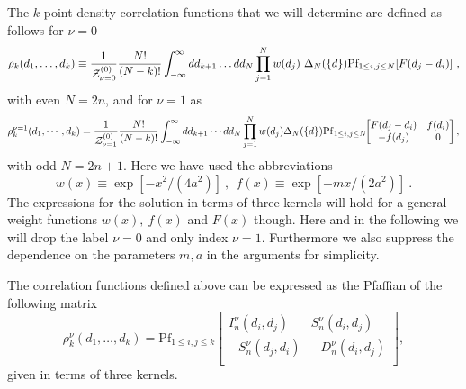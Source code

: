 \documentclass[11pt]{article}
\newcommand{\be}{\begin{equation}}
\newcommand{\ee}{\end{equation}}
\def\Pf{\mbox{Pf}}
\begin{document}
The $k$-point density correlation functions that we will determine are
defined as follows for $\nu=0$
\be
\rho_k(d_1,\ldots,d_k)\equiv\frac{1}{{\cal Z}_{\nu=0}^{(0)}}\frac{N!}{(N-k)!}
\int_{-\infty}^\infty dd_{k+1}\ldots dd_N
\prod_{j=1}^{N} w(d_j)
\ \Delta_{N}(\{d\})\Pf_{1\leq i,j\leq N}[F(d_j-d_i)]\ ,
\label{rhokdef}
\ee
with even $N=2n$, and for $\nu=1$ as 
\be
\rho_k^{\nu=1}(d_1,\cdots,d_k) = \frac{1}{{\cal Z}^{(0)}_{\nu = 1}} 
\frac{N!}{(N-k)!} 
\int_{-\infty}^{\infty} dd_{k+1} \cdots dd_N  
\prod_{j=1}^N w(d_j) \Delta_N(\{d\}) {\rm Pf}_{1 \leq i,j \leq
  N}\!\!\left[ \!\!\!
\begin{array}{cc}  
F(d_j - d_i) & f(d_i) \\ - f(d_j) & 0 \end{array} 
\!\!\!
\right] ,
\ee
with odd $N = 2 n + 1$. 
Here we have used the abbreviations 
\be
w(x)\equiv\exp[-x^2/(4a^2)]\ ,\ \ f(x) \equiv \exp[- m x/(2 a^2)]\ .
\label{weight}
\ee
The expressions for the solution in terms of three kernels will 
hold for a general weight functions $w(x),\ f(x)$  and $F(x)$ though.
Here and in the following we will drop the label $\nu=0$ and only
index $\nu=1$. Furthermore we also suppress the
dependence on the parameters $m,a$ in the
arguments for simplicity. 


The correlation functions defined above 
can be expressed as the Pfaffian of the
following matrix \cite{NF98}
\be
\rho^\nu_k(d_1,\ldots,d_k)= \Pf_{1\leq i,j\leq k}
\left[
\begin{array}{cc}
I^\nu_n(d_i,d_j)& S^\nu_n(d_i,d_j)\\
-S^\nu_n(d_j,d_i)& -D^\nu_n(d_i,d_j)\\
\end{array}
\right],
\label{rhoPf}
\ee
given in terms of three kernels. 
\end{document}

